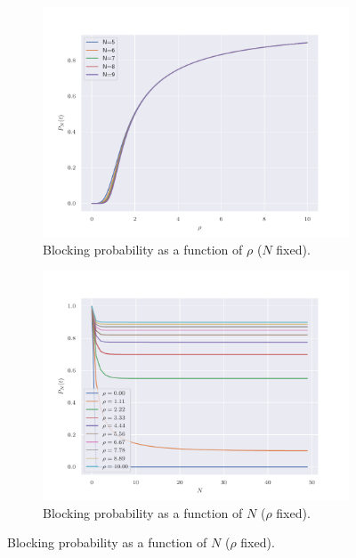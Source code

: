 \documentclass[11pt, a4paper]{report}
\begin{document}

\begin{figure}
    \begin{subfigure}[b]{0.55\textwidth}
        \centering
        \includegraphics[width=\textwidth]{plots/blockProb_Nfix.pdf}
        \caption{Blocking probability as a function of $\rho$ ($N$ fixed).}
        \label{fig:blkprob_N}
    \end{subfigure}
    \hfill
    \begin{subfigure}[b]{0.55\textwidth}
        \centering
        \includegraphics[width=\textwidth]{plots/blockProb_rhofix.pdf}
        \caption{Blocking probability as a function of $N$ ($\rho$ fixed).}
        \label{fig:blkprob_rho}
    \end{subfigure}
    \label{fig:blk_prob}
\end{figure}
\end{document}
